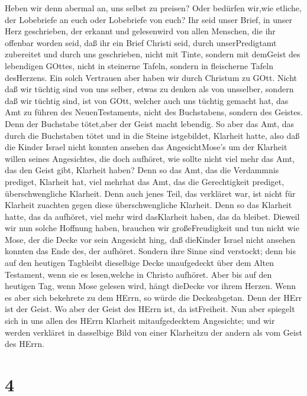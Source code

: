  Heben wir denn abermal an, uns selbst zu preisen? Oder
bedürfen wir,wie etliche, der Lobebriefe an euch oder Lobebriefe von
euch?  Ihr seid unser Brief, in unser Herz geschrieben, der
erkannt und gelesenwird von allen Menschen,  die ihr
offenbar worden seid, daß ihr ein Brief Christi seid, durch
unserPredigtamt zubereitet und durch uns geschrieben, nicht mit Tinte,
sondern mit demGeist des lebendigen GOttes, nicht in steinerne Tafeln,
sondern in fleischerne Tafeln desHerzens.  Ein solch
Vertrauen aber haben wir durch Christum zu GOtt.  Nicht daß
wir tüchtig sind von uns selber, etwas zu denken als von unsselber,
sondern daß wir tüchtig sind, ist von GOtt,  welcher auch
uns tüchtig gemacht hat, das Amt zu führen des NeuenTestaments, nicht
des Buchstabens, sondern des Geistes. Denn der Buchstabe tötet,aber der
Geist macht lebendig.  So aber das Amt, das durch die
Buchstaben tötet und in die Steine istgebildet, Klarheit hatte, also daß
die Kinder Israel nicht konnten ansehen das AngesichtMose's um der
Klarheit willen seines Angesichtes, die doch aufhöret,  wie
sollte nicht viel mehr das Amt, das den Geist gibt, Klarheit haben?
 Denn so das Amt, das die Verdammnis prediget, Klarheit hat,
viel mehrhat das Amt, das die Gerechtigkeit prediget, überschwengliche
Klarheit.  Denn auch jenes Teil, das verkläret war, ist
nicht für Klarheit zuachten gegen diese überschwengliche Klarheit.
 Denn so das Klarheit hatte, das da aufhöret, viel mehr
wird dasKlarheit haben, das da bleibet.  Dieweil wir nun
solche Hoffnung haben, brauchen wir großeFreudigkeit  und
tun nicht wie Mose, der die Decke vor sein Angesicht hing, daß dieKinder
Israel nicht ansehen konnten das Ende des, der aufhöret. 
Sondern ihre Sinne sind verstockt; denn bis auf den heutigen Tagbleibt
dieselbige Decke unaufgedeckt über dem Alten Testament, wenn sie es
lesen,welche in Christo aufhöret.  Aber bis auf den
heutigen Tag, wenn Mose gelesen wird, hängt dieDecke vor ihrem Herzen.
 Wenn es aber sich bekehrete zu dem HErrn, so würde die
Deckeabgetan.  Denn der HErr ist der Geist. Wo aber der
Geist des HErrn ist, da istFreiheit.  Nun aber spiegelt
sich in uns allen des HErrn Klarheit mitaufgedecktem Angesichte; und wir
werden verkläret in dasselbige Bild von einer Klarheitzu der andern als
vom Geist des HErrn.

\hypertarget{section-3}{%
\section{4}\label{section-3}}

